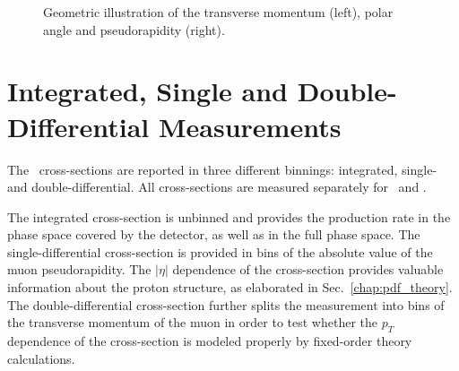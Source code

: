 \begin{figure}[phtb]
  \begin{center}
 \caption{ Geometric illustration of the transverse momentum (left), polar angle and pseudorapidity (right). }
 \label{fig:defetapt}
 \end{center}
\end{figure}

\section{Integrated, Single and Double-Differential Measurements}
The \Wmn\ cross-sections are reported in three different binnings: integrated, single- and double-differential. All cross-sections are measured separately for \Wplus\ and \Wminus.

The integrated cross-section is unbinned and provides the production rate in the phase space covered by the detector, as well as in the full phase space. The single-differential cross-section is provided in bins of the absolute value of the muon pseudorapidity. The $|\eta|$ dependence of the cross-section provides valuable information about the proton structure, as elaborated in Sec.~\ref{chap:pdf_theory}. The double-differential cross-section further splits the measurement into bins of the transverse momentum of the muon in order to test whether the $p_T$ dependence of the cross-section is modeled properly by fixed-order theory calculations.

